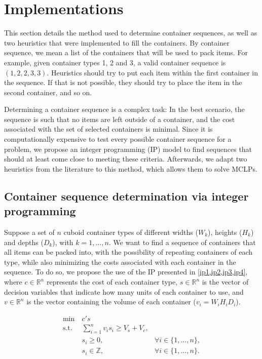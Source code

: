 \section{Implementations}

This section details the method used to determine container sequences, as well as two heuristics that were implemented to fill the containers. By container sequence, we mean a list of the containers that will be used to pack items. For example, given container types 1, 2 and 3, a valid container sequence is $(1, 2, 2, 3, 3)$. Heuristics should try to put each item within the first container in the sequence. If that is not possible, they should try to place the item in the second container, and so on.

Determining a container sequence is a complex task: In the best scenario, the sequence is such that no items are left outside of a container, and the cost associated with the set of selected containers is minimal. Since it is computationally expensive to test every possible container sequence for a problem, we propose an integer programming (IP) model to find sequences that should at least come close to meeting these criteria. Afterwards, we adapt two heuristics from the literature to this method, which allows them to solve MCLPs.

\subsection{Container sequence determination via integer programming}

Suppose a set of $n$ cuboid container types of different widths ($W_k$), heights ($H_k$) and depths ($D_k$), with $k = 1,\dots,n$. We want to find a sequence of containers that all items can be packed into, with the possibility of repeating containers of each type, while also minimizing the costs associated with each container in the sequence. To do so, we propose the use of the IP presented in \cref{ip1,ip2,ip3,ip4}, where $c \in \mathbb{R}^n$ represents the cost of each container type, $s \in \mathbb{R}^n$ is the vector of decision variables that indicate how many units of each container to use, and $v \in \mathbb{R}^n$ is the vector containing the volume of each container ($v_i = W_iH_iD_i$).  

\begin{align}
        \min\ &c's& \label{ip1}\\
        \text{s.t. } &\sum_{i=1}^{n}v_is_i \geq V_s + V_c,& \label{ip2}\\
        &s_i \geq 0,\ &\forall i \in \{1,\dots,n\}, \label{ip3}\\
        &s_i \in \mathbb{Z},\ &\forall i \in \{1,\dots,n\}.
        \label{ip4}
\end{align}

